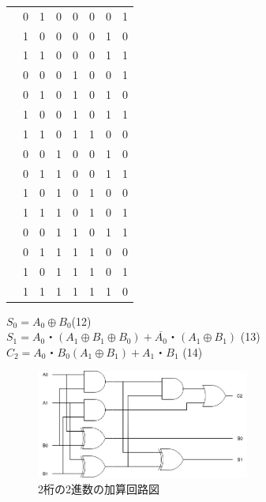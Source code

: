 \documentclass[twocolumn, 10pt,a4j]{jsarticle}
\begin{document}
\begin{enumerate}
\begin{table}[H]
\begin{tabular}{l|llll|lll}
            & 0       & 1       & 0       & 0       & 0       & 0       & 1       \\
            & 1       & 0       & 0       & 0       & 0       & 1       & 0       \\
            & 1       & 1       & 0       & 0       & 0       & 1       & 1       \\
            & 0       & 0       & 0       & 1       & 0       & 0       & 1       \\
            & 0       & 1       & 0       & 1       & 0       & 1       & 0       \\
            & 1       & 0       & 0       & 1       & 0       & 1       & 1       \\
            & 1       & 1       & 0       & 1       & 1       & 0       & 0       \\
            & 0       & 0       & 1       & 0       & 0       & 1       & 0       \\
            & 0       & 1       & 1       & 0       & 0       & 1       & 1       \\
            & 1       & 0       & 1       & 0       & 1       & 0       & 0       \\
            & 1       & 1       & 1       & 0       & 1       & 0       & 1       \\
            & 0       & 0       & 1       & 1       & 0       & 1       & 1       \\
            & 0       & 1       & 1       & 1       & 1       & 0       & 0       \\
            & 1       & 0       & 1       & 1       & 1       & 0       & 1       \\
            & 1       & 1       & 1       & 1       & 1       & 1       & 0      
        \end{tabular}
      \end{table}
      $S_{0} = A_{0} \oplus B_{0} $\quad(12) \\
      $S_{1} = A_{0}・(A_{1} \oplus B_{1} \oplus B_{0}) + \overline{A_{0}}・(A_{1} \oplus B_{1})$ \quad(13) \\
      $C_{2} = A_{0}・B_{0}(A_{1} \oplus B_{1}) + A_{1}・B_{1}$ \quad(14) \\
      \begin{figure}[H]
        \begin{center}
          \includegraphics[width=7cm]{../img/half_adder/ronri.png}
          \caption{2桁の2進数の加算回路図}
        \end{center}
      \end{figure}
    \end{enumerate}
\end{document}
